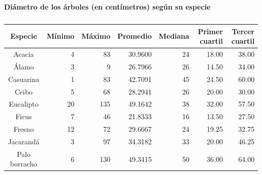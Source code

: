 \documentclass[11pt]{article}
\begin{document}
\begin{table}[h!]
  \begin{center}
    \caption*{\textbf{Diámetro de los árboles (en centímetros) según su especie}}
    \begin{tabular}{| c | r | r | r | r | r | r |}
      \hline
      \textbf{Especie} & \textbf{Mínimo}         & \textbf{Máximo}         & \textbf{Promedio} &
      \textbf{Mediana} & \textbf{Primer cuartil} & \textbf{Tercer cuartil}                                          \\ \hline
      Acacia           & 4                       & 83                      & 30.9600           & 24 & 18.00 & 38.00 \\ \hline
      Álamo            & 3                       & 9                       & 26.7966           & 26 & 14.50 & 34.00 \\ \hline
      Casuarina        & 1                       & 83                      & 42.7091           & 45 & 24.50 & 60.00 \\ \hline
      Ceibo            & 5                       & 68                      & 28.2941           & 26 & 20.00 & 30.00 \\ \hline
      Eucalipto        & 20                      & 135                     & 49.1642           & 38 & 32.00 & 57.50 \\ \hline
      Ficus            & 7                       & 46                      & 21.8333           & 16 & 13.50 & 27.50 \\ \hline
      Fresno           & 12                      & 72                      & 29.6667           & 24 & 19.25 & 32.75 \\ \hline
      Jacarandá        & 3                       & 97                      & 34.3182           & 33 & 20.00 & 46.25 \\ \hline
      Palo borracho    & 6                       & 130                     & 49.3415           & 50 & 36.00 & 64.00 \\ \hline
    \end{tabular}
    \caption{}
    \label{tab:tablaDiametroEspecie}
  \end{center}
\end{table}
\end{document}
